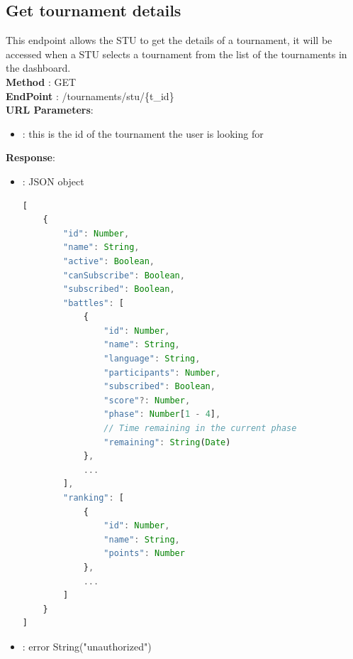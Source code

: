 \subsection*{Get tournament details}
This endpoint allows the STU to get the details of a tournament, it will be accessed when a STU selects a tournament from the list of the tournaments in the dashboard.\\
\textbf{Method} : GET \\
\textbf{EndPoint} : /tournaments/stu/\{t\_id\}\\
\textbf{URL Parameters}:
        \begin{itemize}
            \item {} : this is the id of the tournament the user is looking for
        \end{itemize}
\textbf{Response}:
        \begin{itemize}
            \item {} : JSON object
            \begin{lstlisting}[language=JavaScript, label={lst:jscode}, basicstyle=\ttfamily]
[
    {
        "id": Number,
        "name": String,
        "active": Boolean,
        "canSubscribe": Boolean,
        "subscribed": Boolean,
        "battles": [
            {
                "id": Number,
                "name": String,
                "language": String,
                "participants": Number,
                "subscribed": Boolean,
                "score"?: Number,
                "phase": Number[1 - 4],
                // Time remaining in the current phase
                "remaining": String(Date)
            },
            ...
        ],
        "ranking": [
            {
                "id": Number,
                "name": String,
                "points": Number
            },
            ...
        ]
    }
]
            \end{lstlisting}
            \item {} : error String("unauthorized")
        \end{itemize}

